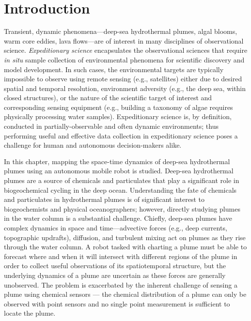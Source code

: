 \section{Introduction}
Transient, dynamic phenomena---deep-sea hydrothermal plumes, algal blooms, warm core eddies, lava flows---are of interest in many disciplines of observational science. \emph{Expeditionary science} encapsulates the observational sciences that require \emph{in situ} sample collection of environmental phenomena for scientific discovery and model development. In such cases, the environmental targets are typically impossible to observe using remote sensing (e.g., satellites) either due to desired spatial and temporal resolution, environment adversity (e.g., the deep sea, within closed structures), or the nature of the scientific target of interest and corresponding sensing equipment (e.g., building a taxonomy of algae requires physically processing water samples). Expeditionary science is, by definition, conducted in partially-observable and often dynamic environments; thus performing useful and effective data collection in expeditionary science poses a challenge for human and autonomous decision-makers alike.

In this chapter, mapping the space-time dynamics of deep-sea hydrothermal plumes using an autonomous mobile robot is studied. Deep-sea hydrothermal plumes are a source of chemicals and particulates that play a significant role in biogeochemical cycling in the deep ocean\autocite{le2019hydrothermal,resing2015basin,dick2013microbiology, vic2018dispersion, scholz2019shelf}. Understanding the fate of chemicals and particulates in hydrothermal plumes is of significant interest to biogeochemists and physical oceanographers; however, directly studying plumes in the water column is a substantial challenge. Chiefly, deep-sea plumes have complex dynamics in space and time---advective forces (e.g., deep currents, topographic updrafts), diffusion, and turbulent mixing act on plumes as they rise through the water column. A robot tasked with charting a plume must be able to forecast where and when it will intersect with different regions of the plume in order to collect useful observations of its spatiotemporal structure, but the underlying dynamics of a plume are uncertain as these forces are generally unobserved. The problem is exacerbated by the inherent challenge of sensing a plume using chemical sensors --- the chemical distribution of a plume can only be observed with point sensors and no single point measurement is sufficient to locate the plume.

